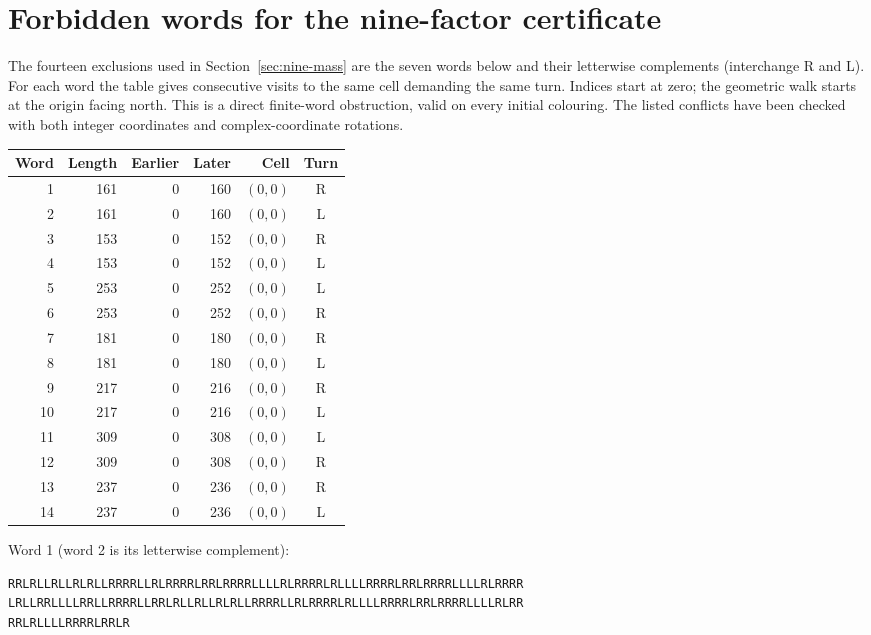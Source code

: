 \section{Forbidden words for the nine-factor certificate}\label{app:nine-forbidden}
The fourteen exclusions used in Section~\ref{sec:nine-mass} are the seven
words below and their letterwise complements (interchange R and L).
For each word the table gives consecutive visits to the same cell demanding
the same turn. Indices start at zero; the geometric walk starts at the origin
facing north. This is a direct finite-word obstruction, valid on every
initial colouring. The listed conflicts have been checked with both integer
coordinates and complex-coordinate rotations.

\begin{center}\small
\begin{tabular}{rrrrrc}
\toprule Word & Length & Earlier & Later & Cell & Turn\\\midrule
1 & 161 & 0 & 160 & $(0,0)$ & R\\
2 & 161 & 0 & 160 & $(0,0)$ & L\\
3 & 153 & 0 & 152 & $(0,0)$ & R\\
4 & 153 & 0 & 152 & $(0,0)$ & L\\
5 & 253 & 0 & 252 & $(0,0)$ & L\\
6 & 253 & 0 & 252 & $(0,0)$ & R\\
7 & 181 & 0 & 180 & $(0,0)$ & R\\
8 & 181 & 0 & 180 & $(0,0)$ & L\\
9 & 217 & 0 & 216 & $(0,0)$ & R\\
10 & 217 & 0 & 216 & $(0,0)$ & L\\
11 & 309 & 0 & 308 & $(0,0)$ & L\\
12 & 309 & 0 & 308 & $(0,0)$ & R\\
13 & 237 & 0 & 236 & $(0,0)$ & R\\
14 & 237 & 0 & 236 & $(0,0)$ & L\\
\bottomrule\end{tabular}\end{center}

\noindent\begin{minipage}{\linewidth}
\noindent Word 1 (word 2 is its letterwise complement):
\begin{verbatim}
RRLRLLRLLRLRLLRRRRLLRLRRRRLRRLRRRRLLLLRLRRRRLRLLLLRRRRLRRLRRRRLLLLRLRRRR
LRLLRRLLLLRRLLRRRRLLRRLRLLRLLRLRLLRRRRLLRLRRRRLRLLLLRRRRLRRLRRRRLLLLRLRR
RRLRLLLLRRRRLRRLR
\end{verbatim}
\end{minipage}\par\medskip

